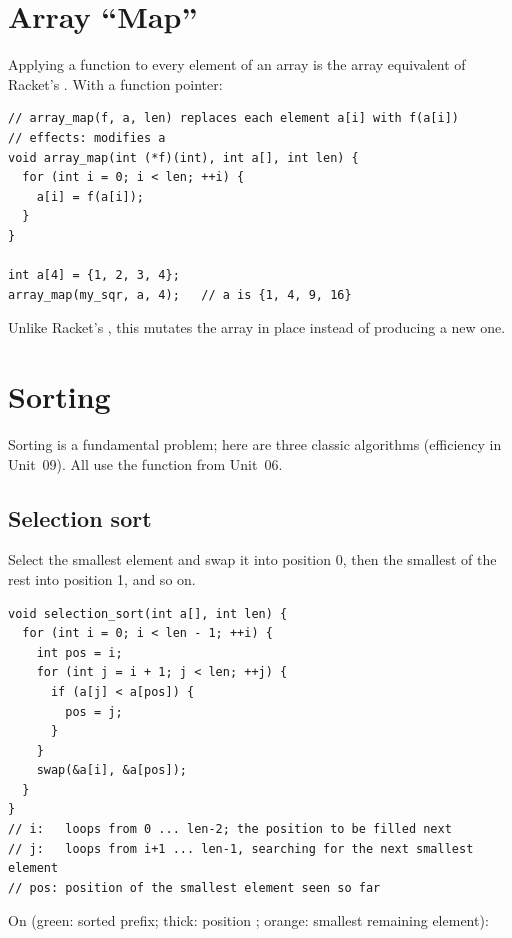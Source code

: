 \section{Array ``Map''}

Applying a function to every element of an array is the array equivalent of Racket's
. With a function pointer:
\begin{lstlisting}[style=c]
// array_map(f, a, len) replaces each element a[i] with f(a[i])
// effects: modifies a
void array_map(int (*f)(int), int a[], int len) {
  for (int i = 0; i < len; ++i) {
    a[i] = f(a[i]);
  }
}

int a[4] = {1, 2, 3, 4};
array_map(my_sqr, a, 4);   // a is {1, 4, 9, 16}
\end{lstlisting}
Unlike Racket's , this mutates the array in place instead of producing a new one.

\section{Sorting}

Sorting is a fundamental problem; here are three classic algorithms (efficiency in Unit~09).
All use the  function from Unit~06.

\subsection{Selection sort}

Select the smallest element and swap it into position 0, then the smallest of the rest into
position 1, and so on.
\begin{lstlisting}[style=c]
void selection_sort(int a[], int len) {
  for (int i = 0; i < len - 1; ++i) {
    int pos = i;
    for (int j = i + 1; j < len; ++j) {
      if (a[j] < a[pos]) {
        pos = j;
      }
    }
    swap(&a[i], &a[pos]);
  }
}
// i:   loops from 0 ... len-2; the position to be filled next
// j:   loops from i+1 ... len-1, searching for the next smallest element
// pos: position of the smallest element seen so far
\end{lstlisting}

On  (green: sorted prefix; thick: position ; orange:
smallest remaining element):

